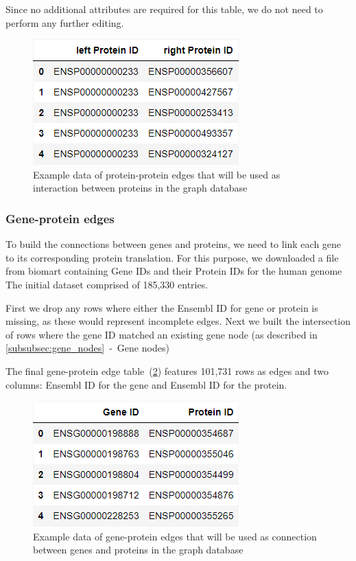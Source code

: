 Since no additional attributes are required for this table, we do not need to perform any further editing.

\begin{figure}[h]
    \centering
    \includegraphics[height=\dfheight]{figures/03_02_protein_edges}
    \caption{Example data of protein-protein edges that will be used as interaction between proteins in the graph database}
    \label{fig:03_02_df_protein_edges}
\end{figure}



\subsubsection*{Gene-protein edges} \label{subsubsec:gene_protein_interaction}
To build the connections between genes and proteins, we need to link each gene to its corresponding protein translation.
For this purpose, we downloaded a file from biomart containing Gene IDs and their Protein IDs for the human genome~\cite{bio_marts}
The initial dataset comprised of 185,330 entries.

First we drop any rows where either the Ensembl ID for gene or protein is missing, as these would represent incomplete edges.
Next we built the intersection of rows where the gene ID matched an existing gene node (as described in \ref{subsubsec:gene_nodes}~-~Gene nodes)

The final gene-protein edge table~(\cref{fig:03_02_df_gene_protein_edges}) features 101,731 rows as edges and two columns:
Ensembl ID for the gene and Ensembl ID for the protein.

\begin{figure}[h]
    \centering
    \includegraphics[height=\dfheight]{figures/03_02_gene_protein_edges}
    \caption{Example data of gene-protein edges that will be used as connection between genes and proteins in the graph database}
    \label{fig:03_02_df_gene_protein_edges}
\end{figure}



